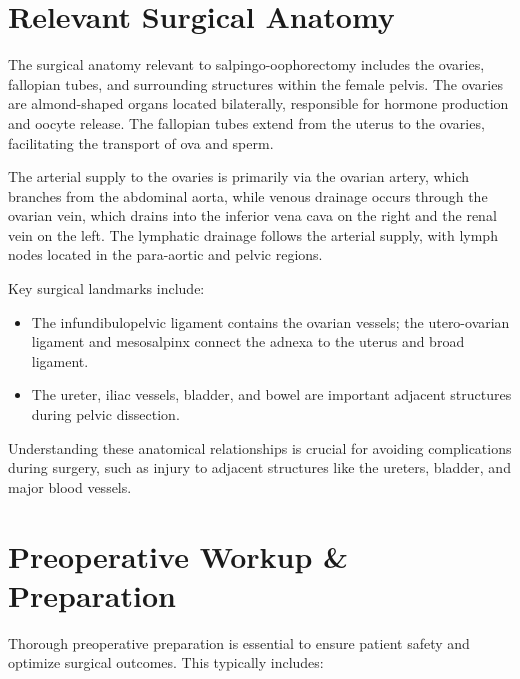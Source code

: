 \section*{Relevant Surgical Anatomy}
The surgical anatomy relevant to salpingo-oophorectomy includes the ovaries, fallopian tubes, and surrounding structures within the female pelvis. The ovaries are almond-shaped organs located bilaterally, responsible for hormone production and oocyte release. The fallopian tubes extend from the uterus to the ovaries, facilitating the transport of ova and sperm. 

The arterial supply to the ovaries is primarily via the ovarian artery, which branches from the abdominal aorta, while venous drainage occurs through the ovarian vein, which drains into the inferior vena cava on the right and the renal vein on the left. The lymphatic drainage follows the arterial supply, with lymph nodes located in the para-aortic and pelvic regions.

Key surgical landmarks include:

\begin{itemize}
  \item The infundibulopelvic ligament contains the ovarian vessels; the utero-ovarian ligament and mesosalpinx connect the adnexa to the uterus and broad ligament.
  \item The ureter, iliac vessels, bladder, and bowel are important adjacent structures during pelvic dissection.
\end{itemize}

Understanding these anatomical relationships is crucial for avoiding complications during surgery, such as injury to adjacent structures like the ureters, bladder, and major blood vessels.

\section*{Preoperative Workup \& Preparation}
Thorough preoperative preparation is essential to ensure patient safety and optimize surgical outcomes. This typically includes:

